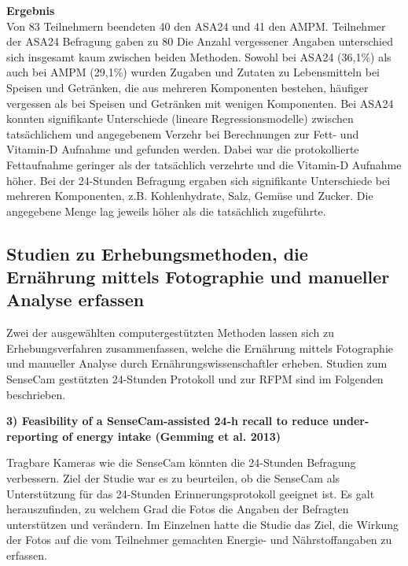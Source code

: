 \textbf{Ergebnis}\\
Von 83 Teilnehmern beendeten 40 den ASA24 und 41 den AMPM. Teilnehmer der ASA24 Befragung gaben zu 80%
Die Anzahl vergessener Angaben unterschied sich insgesamt kaum zwischen beiden Methoden. Sowohl bei ASA24 (36,1\%) als auch bei AMPM (29,1\%) wurden Zugaben und Zutaten zu Lebensmitteln bei Speisen und Getränken, die aus mehreren Komponenten bestehen, häufiger vergessen als bei Speisen und Getränken mit wenigen Komponenten. 
Bei ASA24 konnten signifikante Unterschiede   (lineare Regressionsmodelle) zwischen tatsächlichem und angegebenem Verzehr bei Berechnungen zur Fett- und Vitamin-D Aufnahme und gefunden werden. Dabei war die protokollierte Fettaufnahme geringer als der tatsächlich verzehrte und die Vitamin-D Aufnahme höher. Bei der 24-Stunden Befragung ergaben sich signifikante Unterschiede bei mehreren Komponenten, z.B. Kohlenhydrate, Salz, Gemüse und Zucker. Die angegebene Menge lag jeweils höher als die tatsächlich zugeführte. 



\subsection{Studien zu Erhebungsmethoden, die Ernährung mittels Fotographie und manueller Analyse erfassen}
Zwei der ausgewählten computergestützten Methoden lassen sich zu Erhebungsverfahren zusammenfassen, welche die Ernährung mittels Fotographie und manueller Analyse durch Ernährungswissenschaftler erheben. Studien zum SenseCam gestützten 24-Stunden Protokoll und zur RFPM sind im Folgenden beschrieben.

\textbf{3) Feasibility of a SenseCam-assisted 24-h recall to reduce under-reporting of energy intake (Gemming et al. 2013)}

Tragbare Kameras wie die SenseCam könnten die 24-Stunden Befragung verbessern. Ziel der Studie war es zu beurteilen, ob die SenseCam als Unterstützung für das 24-Stunden Erinnerungsprotokoll geeignet ist. Es galt herauszufinden, zu welchem Grad die Fotos die Angaben der Befragten unterstützen und verändern. Im Einzelnen hatte die Studie das Ziel, die Wirkung der Fotos auf die vom Teilnehmer gemachten Energie- und Nährstoffangaben zu erfassen.


